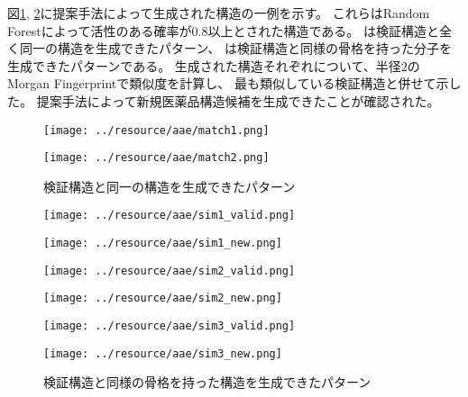図\ref{fig:aae_identical}, \ref{fig:aae_similar}に提案手法によって生成された構造の一例を示す。
これらはRandom Forestによって活性のある確率が$0.8$以上とされた構造である。
は検証構造と全く同一の構造を生成できたパターン、
は検証構造と同様の骨格を持った分子を生成できたパターンである。
生成された構造それぞれについて、半径$2$のMorgan Fingerprintで類似度を計算し、
最も類似している検証構造と併せて示した。
提案手法によって新規医薬品構造候補を生成できたことが確認された。
\begin{figure}[tbp]
    \begin{minipage}[h]{0.49\hsize}
    \centering
    \texttt{[image: ../resource/aae/match1.png]} 
    \end{minipage}
    \begin{minipage}[h]{0.49\hsize}    
    \centering
    \texttt{[image: ../resource/aae/match2.png]}
    \end{minipage}
\caption{検証構造と同一の構造を生成できたパターン} \label{fig:aae_identical}
\end{figure}
\begin{figure}[tbp]
    \begin{minipage}[b]{0.49\hsize}
    \centering
    \texttt{[image: ../resource/aae/sim1\_valid.png]} 
    \end{minipage}
    \begin{minipage}[b]{0.49\hsize}    
    \centering
    \texttt{[image: ../resource/aae/sim1\_new.png]}
    \end{minipage}

    \begin{minipage}[b]{0.49\hsize}    
        \centering
        \texttt{[image: ../resource/aae/sim2\_valid.png]}
        \end{minipage}
    \begin{minipage}[b]{0.49\hsize}    
        \centering
        \texttt{[image: ../resource/aae/sim2\_new.png]}
    \end{minipage}

    \begin{minipage}[b]{0.49\hsize}    
        \centering
        \texttt{[image: ../resource/aae/sim3\_valid.png]}
    \end{minipage}
    \begin{minipage}[b]{0.49\hsize}    
        \centering
        \texttt{[image: ../resource/aae/sim3\_new.png]}
    \end{minipage}
\caption{検証構造と同様の骨格を持った構造を生成できたパターン} \label{fig:aae_similar}
\end{figure}

